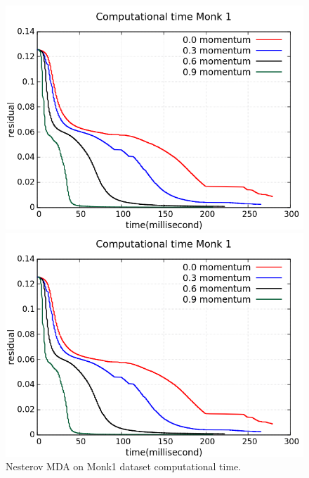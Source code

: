 \begin{figure}[H]
	\centering
	\begin{minipage}[t]{0.5\linewidth}
		\includegraphics[width=\linewidth]{data/MGD/Monk1/NM/Monk1_NMGD_CT_standard.png}
	\end{minipage}%
	\begin{minipage}[t]{0.5\linewidth}
		\includegraphics[width=\linewidth]{data/MGD/Monk1/NM/Monk1_NMGD_CT_zoom.png}
	\end{minipage}
	\caption{Nesterov MDA on Monk1 dataset computational time.}
\end{figure}
